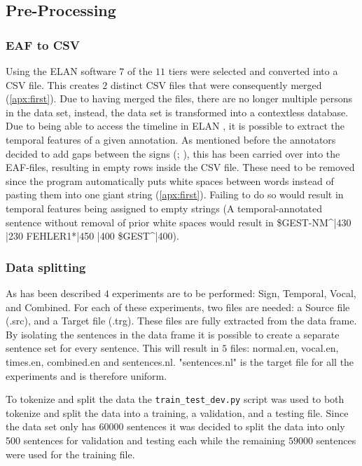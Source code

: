\subsection{Pre-Processing}

\subsubsection{EAF to CSV}
Using the ELAN software $7$ of the $11$ tiers were selected and converted into a CSV file. This creates $2$ distinct CSV files that were consequently merged (\autoref{apx:first}). Due to having merged the files, there are no longer multiple persons in the data set, instead, the data set is transformed into a contextless database. Due to being able to access the timeline in ELAN \cite{elan_software}, it is possible to extract the temporal features of a given annotation. As mentioned before the annotators decided to add gaps between the signs (\citealp{hankesegmentation}; \citealp{konradoffentliches}), this has been carried over into the EAF-files, resulting in empty rows inside the CSV file. These need to be removed since the program automatically puts white spaces between words instead of pasting them into one giant string (\autoref{apx:first}). Failing to do so would result in temporal features being assigned to empty strings (A temporal-annotated sentence without removal of prior white spaces would result in \$GEST-NM\textasciicircum|430 |230 FEHLER1*|450 |400 \$GEST\textasciicircum|400).

\subsubsection{Data splitting}

As has been described $4$ experiments are to be performed: Sign, Temporal, Vocal, and Combined. For each of these experiments, two files are needed: a Source file (.src), and a Target file (.trg). These files are fully extracted from the data frame. By isolating the sentences in the data frame it is possible to create a separate sentence set for every sentence. This will result in $5$ files: normal.en, vocal.en, times.en, combined.en and sentences.nl. "sentences.nl" is the target file for all the experiments and is therefore uniform.

To tokenize and split the data the \texttt{train\_test\_dev.py} \cite{dimitarshterionovtrain} script was used to both tokenize and split the data into a training, a validation, and a testing file. Since the data set only has $60000$ sentences it was decided to split the data into only 500 sentences for validation and testing each while the remaining $59000$ sentences were used for the training file.

